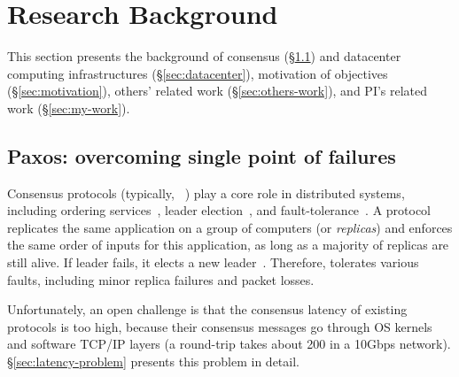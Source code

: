 \vspace{-.15in}\section{Research Background} 
\label{sec:background}\vspace{-.075in}

This section presents the background of consensus (\S\ref{sec:consensus}) and 
datacenter computing infrastructures (\S\ref{sec:datacenter}), motivation of 
objectives (\S\ref{sec:motivation}), others' related work 
(\S\ref{sec:others-work}), and PI's related work (\S\ref{sec:my-work}).

\vspace{-.15in}\subsection{Paxos: overcoming single point of failures} 
\label{sec:consensus}\vspace{-.075in}

Consensus protocols (typically, 
\paxos~\cite{paxos:practical,paxos,paxos:simple,paxos:complex}) play a 
core role in distributed systems, including ordering 
services~\cite{ellis:thesis,manos:hotdep10,scatter:sosp11},
leader election~\cite{zookeeper, chubby:osdi}, and
fault-tolerance~\cite{eve:osdi12,rex:eurosys14,crane:sosp15}. A \paxos protocol
replicates the same application on a group of computers (or \emph{replicas}) 
and enforces the same order of inputs for this application, as long as 
a majority of replicas are still alive. If leader fails, it elects a new 
leader~\cite{paxos:practical}. Therefore, \paxos tolerates 
various faults, including minor replica failures and packet losses. 


Unfortunately, an open challenge is that the consensus latency of existing 
\paxos protocols is too high, because their consensus messages go through OS 
kernels and software TCP/IP layers (a  round-trip takes about 200 \us 
in a 10Gbps network). \S\ref{sec:latency-problem} presents this problem in 
detail.

